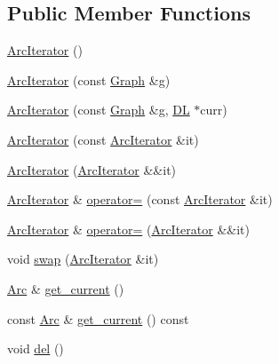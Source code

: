 \subsection*{Public Member Functions}
\begin{DoxyCompactItemize}
\item 
\hyperlink{class_designar_1_1_graph_1_1_arc_iterator_a642cf08854577ea29ba520ee882c9d54}{Arc\+Iterator} ()
\item 
\hyperlink{class_designar_1_1_graph_1_1_arc_iterator_afeb58fdc5c6d4fd2d57c2ce53969203e}{Arc\+Iterator} (const \hyperlink{class_designar_1_1_graph}{Graph} \&g)
\item 
\hyperlink{class_designar_1_1_graph_1_1_arc_iterator_a2a9eb9d16ff5d80a22671dfdbe9ce3a2}{Arc\+Iterator} (const \hyperlink{class_designar_1_1_graph}{Graph} \&g, \hyperlink{class_designar_1_1_d_l}{DL} $\ast$curr)
\item 
\hyperlink{class_designar_1_1_graph_1_1_arc_iterator_a42fba48323675143026319401967e8c6}{Arc\+Iterator} (const \hyperlink{class_designar_1_1_graph_1_1_arc_iterator}{Arc\+Iterator} \&it)
\item 
\hyperlink{class_designar_1_1_graph_1_1_arc_iterator_a1446dc2d05faf881728a6721a9253129}{Arc\+Iterator} (\hyperlink{class_designar_1_1_graph_1_1_arc_iterator}{Arc\+Iterator} \&\&it)
\item 
\hyperlink{class_designar_1_1_graph_1_1_arc_iterator}{Arc\+Iterator} \& \hyperlink{class_designar_1_1_graph_1_1_arc_iterator_acce205d4f59317865d8a7e85598d141d}{operator=} (const \hyperlink{class_designar_1_1_graph_1_1_arc_iterator}{Arc\+Iterator} \&it)
\item 
\hyperlink{class_designar_1_1_graph_1_1_arc_iterator}{Arc\+Iterator} \& \hyperlink{class_designar_1_1_graph_1_1_arc_iterator_abd43d384ad590121f38d92d7af294195}{operator=} (\hyperlink{class_designar_1_1_graph_1_1_arc_iterator}{Arc\+Iterator} \&\&it)
\item 
void \hyperlink{class_designar_1_1_graph_1_1_arc_iterator_a12989f76c5a96637698000757b6dc6f4}{swap} (\hyperlink{class_designar_1_1_graph_1_1_arc_iterator}{Arc\+Iterator} \&it)
\item 
\hyperlink{class_designar_1_1_graph_a74c730ef4ce2d20f998d72bd25c2b5bf}{Arc} \& \hyperlink{class_designar_1_1_graph_1_1_arc_iterator_a4915ccaef38293e9dc449e7dba3965ec}{get\+\_\+current} ()
\item 
const \hyperlink{class_designar_1_1_graph_a74c730ef4ce2d20f998d72bd25c2b5bf}{Arc} \& \hyperlink{class_designar_1_1_graph_1_1_arc_iterator_ac7b91a766ed21ee9a69024d8a6548bbd}{get\+\_\+current} () const
\item 
void \hyperlink{class_designar_1_1_graph_1_1_arc_iterator_a6375bb0513856b2b20dffbfb2496082e}{del} ()
\end{DoxyCompactItemize}
